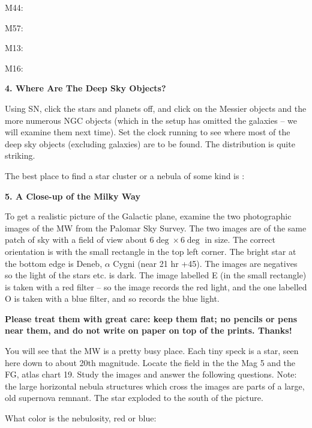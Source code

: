 \documentclass[12pt]{article}
\begin{document}
\medskip
M44: \makebox[3cm]{\hrulefill} 

\medskip
M57: \makebox[3cm]{\hrulefill}

\medskip
M13: \makebox[3cm]{\hrulefill}

\medskip
M16: \makebox[3cm]{\hrulefill}

\vspace{.5cm}
\bigskip

\noindent
{\bf 4. Where Are The Deep Sky Objects?}

\medskip
\noindent
Using SN, click the stars and planets off, and click on the Messier objects
and the more numerous NGC objects (which in the setup has omitted the
galaxies -- we will examine them next time). Set the clock running to
see where most of the deep sky objects (excluding galaxies) are to be
found. The distribution is quite striking.

\bigskip
\noindent
The best place to find a star cluster or a nebula of some kind is : 
\makebox[3cm]{\hrulefill}


\bigskip
\medskip
\noindent

\noindent
{\bf 5. A Close-up of the Milky Way}

\medskip
\noindent
To get a realistic picture of the Galactic plane, examine the two
photographic images of the MW from the Palomar Sky Survey. The two
images are of the same patch of sky with a field of view about $6\deg
\times 6\deg$ in size.  The correct orientation is with the small
rectangle in the top left corner. The bright star at the bottom edge
is Deneb, $\alpha$ Cygni (near 21 hr +45\deg).  The images are
negatives so the light of the stars etc. is dark. The image labelled E
(in the small rectangle) is taken with a red filter -- so the image
records the red light, and the one labelled O is taken with a blue
filter, and so records the blue light.

\medskip
\noindent
{\bf Please treat them with great care: keep them flat; no pencils or
  pens near them, and do not write on paper on top of the
  prints. Thanks!}

\medskip
\noindent
You will see that the MW is a pretty busy place. Each tiny speck is a
star, seen here down to about 20th magnitude. Locate the field in
the the Mag 5 and the FG, atlas chart 19. Study the images and answer
the following questions. Note: the large horizontal nebula structures which
cross the images are parts of a large, old supernova remnant. The star
exploded to the south of the picture.


\bigskip
\noindent
What color is the nebulosity, red or blue: \makebox[4cm]{\hrulefill}
\end{document}
